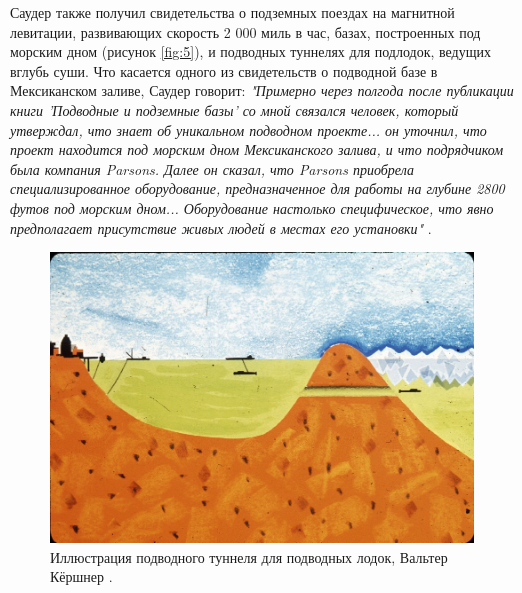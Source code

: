 \documentclass[10pt,twocolumn,letterpaper]{article}
\begin{document}
Саудер также получил свидетельства о подземных поездах на магнитной левитации, развивающих скорость 2 000 миль в час, базах, построенных под морским дном (рисунок \ref{fig:5}), и подводных туннелях для подлодок, ведущих вглубь суши. Что касается одного из свидетельств о подводной базе в Мексиканском заливе, Саудер говорит: \textit{"Примерно через полгода после публикации книги 'Подводные и подземные базы' со мной связался человек, который утверждал, что знает об уникальном подводном проекте... он уточнил, что проект находится под морским дном Мексиканского залива, и что подрядчиком была компания Parsons. Далее он сказал, что Parsons приобрела специализированное оборудование, предназначенное для работы на глубине 2800 футов под морским дном... Оборудование настолько специфическое, что явно предполагает присутствие живых людей в местах его установки"} \cite{22}.
\begin{figure}[t]
\begin{center}
   \includegraphics[width=1\linewidth]{sub.jpg}
\end{center}
   \caption{Иллюстрация подводного туннеля для подводных лодок, Вальтер Кёршнер \cite{22,23}.}
\label{fig:6}
\label{fig:onecol}
\end{figure}
\end{document}
